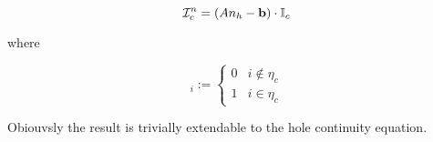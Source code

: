 \begin{equation}
\mathcal{I}_c^n = (An_h-\mathbf{b})\cdot \mathbb{I}_c
\end{equation} 

where

\begin{equation}
[\mathbb{I}_c]_i := \left\{ \begin{array}{ll}
0 & i \notin \eta_c \\
1 & i \in \eta_c
\end{array}  \right.
\end{equation} 

Obiouvsly the result is trivially extendable to the hole continuity equation. 

%
%
%
%
%
%
%
%
%
%
